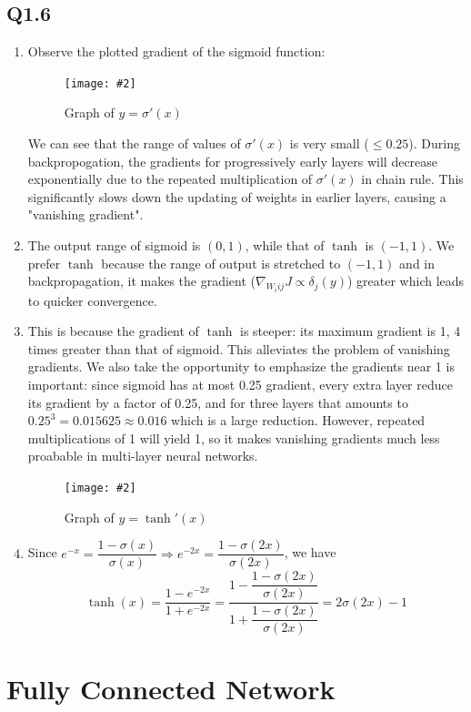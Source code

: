 \documentclass{article} %
\newcommand{\img}[3][0.3]{    
    \begin{figure}[H]
        \centering
        \texttt{[image: \#2]}
        \caption{#3}
    \end{figure}
}
\begin{document}
    \subsection*{Q1.6}
    \begin{enumerate}
        \item Observe the plotted gradient of the sigmoid function:

        \img{sigmoid.png}{Graph of $y=\sigma'(x)$}
    
        We can see that the range of values of $\sigma'(x)$ is very small ($\leq0.25$). During backpropogation, the gradients for progressively early layers will decrease exponentially due to the repeated multiplication of $\sigma'(x)$ in chain rule. This significantly slows down the updating of weights in earlier layers, causing a "vanishing gradient".

        \item The output range of sigmoid is $(0,1)$, while that of $\tanh{}$ is $(-1,1)$. We prefer $\tanh$ because the range of output is stretched to $(-1,1)$ and in backpropagation, it makes the gradient ($\nabla_{W_i{ij}}J\propto\delta_j(y)$) greater which leads to quicker convergence.

        \item This is because the gradient of $\tanh$ is steeper: its maximum gradient is 1, 4 times greater than that of sigmoid. This alleviates the problem of vanishing gradients. We also take the opportunity to emphasize the gradients near 1 is important: since sigmoid has at most 0.25 gradient, every extra layer reduce its gradient by a factor of 0.25, and for three layers that amounts to $0.25^3=0.015625\approx0.016$ which is a large reduction. However, repeated multiplications of 1 will yield 1, so it makes vanishing gradients much less proabable in multi-layer neural networks.

        \img{tanh.png}{Graph of $y=\tanh'(x)$}
        
        \item Since $e^{- x}=\dfrac{1 - \sigma \left(x\right)}{\sigma \left(x\right)}\Longrightarrow e^{- 2 x}=\dfrac{1 - \sigma \left(2 x\right)}{\sigma \left(2 x\right)}$, we have
        $$ \tanh\left(x\right)=\dfrac{1 - e^{- 2 x}}{1 + e^{- 2 x}}=\dfrac{1 - \dfrac{1 - \sigma \left(2 x\right)}{\sigma \left(2 x\right)}}{1 + \dfrac{1 - \sigma \left(2 x\right)}{\sigma \left(2 x\right)}}=2\sigma\left(2 x\right)-1 $$
    \end{enumerate}

    \section{Fully Connected Network}
\end{document}
